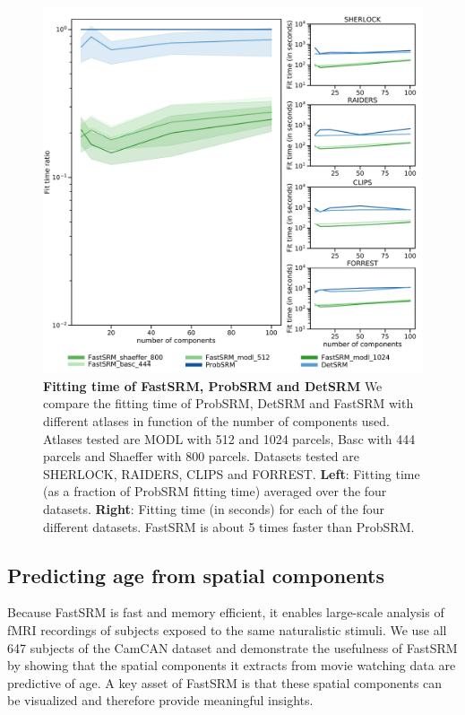 \begin{figure}
\centering
\includegraphics[scale=0.33]{figures/srm/fit_time.pdf}

\caption{\textbf{Fitting time of FastSRM, ProbSRM and DetSRM} We compare the fitting time of ProbSRM, DetSRM and FastSRM with different atlases in function of the number of components used. Atlases tested are MODL with 512 and 1024 parcels, Basc with 444 parcels and Shaeffer with 800 parcels. Datasets tested are SHERLOCK, RAIDERS, CLIPS and FORREST.
\textbf{Left}: Fitting time (as a fraction of ProbSRM fitting time) averaged over the four datasets.
\textbf{Right}: Fitting time (in seconds) for each of the four different datasets.
FastSRM is about 5 times faster than ProbSRM.}
\label{fig:fit_time}
\end{figure}

\subsection{Predicting age from spatial components}
Because FastSRM is fast and memory efficient, it enables large-scale analysis of fMRI recordings of subjects exposed to the same naturalistic stimuli.
%
We use all 647 subjects of the CamCAN dataset and demonstrate the usefulness of FastSRM by showing that the spatial components it extracts from movie watching data are predictive of age.
%
A key asset of FastSRM is that these spatial components can be visualized and therefore provide meaningful insights. 


